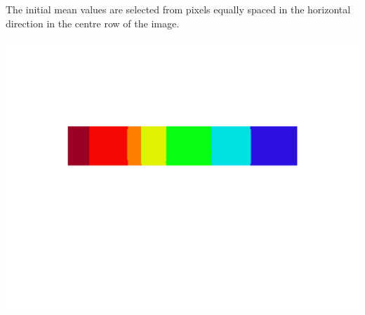 \documentclass[fleqn]{article}
\begin{document}
The initial mean values are selected from pixels equally spaced in the horizontal direction in the centre row of
the image.\\\\
\includegraphics[scale=0.4]{./pics/task1and2/spectrum_k=7_equidistant/K=7_iteration_14_mid_equidistant_7_spectrum.png}\\ 
\end{document}
